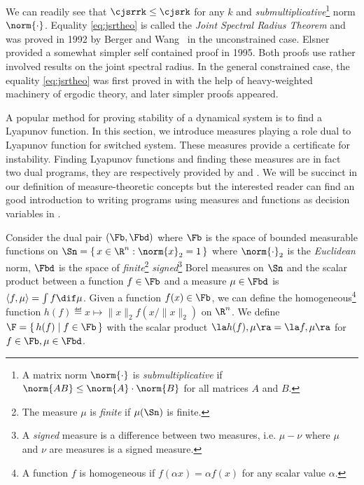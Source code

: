 

We can readily see that
\(
  \cjsrrk \leq \cjsrk
\)
for any $k$ and \emph{submultiplicative}\footnote{A matrix norm $\norm{\cdot}$ is \emph{submultiplicative} if $\norm{AB} \leq \norm{A} \cdot \norm{B}$ for all matrices $A$ and $B$.} norm $\norm{\cdot}$.
Equality \eqref{eq:jsrtheo} is called the \emph{Joint Spectral Radius Theorem} and was proved in 1992 by Berger and Wang~\cite{berger1992bounded} in the unconstrained case.
Elsner~\cite{elsner1995generalized} provided a somewhat simpler self contained proof in 1995.
Both proofs use rather involved results on the joint spectral radius.
In the general constrained case, the equality \eqref{eq:jsrtheo}
was first proved in \cite{dai2012gel} with the help of heavy-weighted machinery
of ergodic theory, and later simpler proofs appeared.

A popular method for proving stability of a dynamical system is to find a Lyapunov function.
In this section, we introduce measures playing a role dual to Lyapunov function for switched system.
These measures provide a certificate for instability.
Finding Lyapunov functions and finding these measures are in fact two dual programs, %
they are respectively provided by  and .
We will be succinct in our definition of measure-theoretic concepts but the interested reader can find an good introduction to writing programs using measures and functions as decision variables in \cite{Lasserre2009}.

Consider the dual pair $(\Fb, \Fbd)$ where $\Fb$ is the space of bounded measurable
functions on $\Sn = \{\, x \in \R^n : \norm{x}_2 = 1 \,\}$ where $\norm{\cdot}_2$ is the \emph{Euclidean} norm, $\Fbd$ is the space of \emph{finite}\footnote{The measure $\mu$ is \emph{finite} if $\mu(\Sn)$ is finite.} \emph{signed}\footnote{A \emph{signed} measure is a difference between two measures, i.e. $\mu - \nu$ where $\mu$ and $\nu$ are measures is a signed measure.} Borel measures on $\Sn$ and the scalar product between a function $f \in \Fb$ and a measure $\mu \in \Fbd$ is $\langle f, \mu \rangle = \int f \dif \mu$.
Given a function $f(x) \in \Fb$, we can define the homogeneous\footnote{A function $f$ is homogeneous if $f(\alpha x) = \alpha f(x)$ for any scalar value $\alpha$.}
function $h(f) \eqdef x \mapsto \|x\|_2f(x/\|x\|_2)$ on $\R^n$.
We define $\F = \{\, h(f) \mid f \in \Fb \,\}$ with the scalar product $\la h(f), \mu \ra = \la f, \mu \ra$ for $f \in \Fb, \mu \in \Fbd$.

